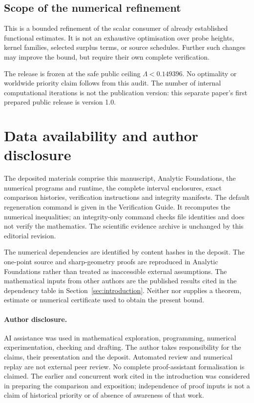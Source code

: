 \documentclass[11pt,a4paper]{article}
\begin{document}
\subsection{Scope of the numerical refinement}\label{scope-of-the-opportunity-audit}

This is a bounded refinement of the scalar consumer of already established
functional estimates. It is not an exhaustive optimisation over probe heights,
kernel families, selected surplus terms, or source schedules. Further such
changes may improve the bound, but require their own complete verification.

The release is frozen at the safe public ceiling \(\Lambda<0.149396\).
No optimality or worldwide priority claim follows from this audit.
The number of internal computational iterations is not the publication
version: this separate paper's first prepared public release is version 1.0.

\section{Data availability and author disclosure}\label{availability-and-assistance}

The deposited materials comprise this manuscript, Analytic Foundations,
the numerical programs and runtime, the complete interval enclosures,
exact comparison histories, verification instructions and integrity manifests.
The default regeneration command is given in the Verification Guide.
It recomputes the numerical inequalities; an integrity-only command checks
file identities and does not verify the mathematics. The scientific evidence
archive is unchanged by this editorial revision.

The numerical dependencies are identified by content hashes in the deposit.
The one-point source and sharp-geometry proofs are reproduced in Analytic
Foundations rather than treated as inaccessible external assumptions.
The mathematical inputs from other authors are the published results cited
in the dependency table in Section~\ref{sec:introduction}. Neither
\cite{gomila} nor \cite{gordon} supplies a theorem, estimate or numerical
certificate used to obtain the present bound.

\paragraph{Author disclosure.}
AI assistance was used in mathematical exploration, programming, numerical
experimentation, checking and drafting. The author takes responsibility for
the claims, their presentation and the deposit. Automated review and
numerical replay are not external peer review. No complete proof-assistant
formalisation is claimed. The earlier and concurrent work cited in the
introduction was considered in preparing the comparison and exposition;
independence of proof inputs is not a claim of historical priority or of
absence of awareness of that work.
\end{document}
